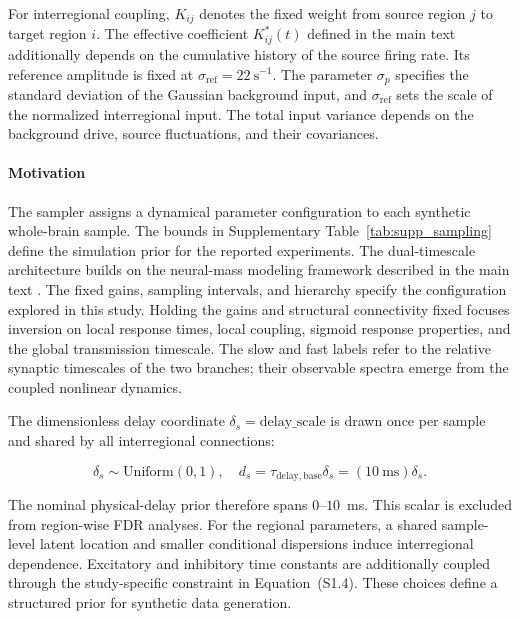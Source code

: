 \documentclass[11pt]{article}
\begin{document}
For interregional coupling, $K_{ij}$ denotes the fixed weight from source region $j$ to target region $i$. The effective coefficient $K_{ij}^{*}(t)$ defined in the main text additionally depends on the cumulative history of the source firing rate. Its reference amplitude is fixed at $\sigma_{\mathrm{ref}}=22~\mathrm{s}^{-1}$. The parameter $\sigma_p$ specifies the standard deviation of the Gaussian background input, and $\sigma_{\mathrm{ref}}$ sets the scale of the normalized interregional input. The total input variance depends on the background drive, source fluctuations, and their covariances.


\paragraph{Motivation}
The sampler assigns a dynamical parameter configuration to each synthetic whole-brain sample. The bounds in Supplementary Table~\ref{tab:supp_sampling} define the simulation prior for the reported experiments. The dual-timescale architecture builds on the neural-mass modeling framework described in the main text \citep{david2003modeling}. The fixed gains, sampling intervals, and hierarchy specify the configuration explored in this study. Holding the gains and structural connectivity fixed focuses inversion on local response times, local coupling, sigmoid response properties, and the global transmission timescale. The slow and fast labels refer to the relative synaptic timescales of the two branches; their observable spectra emerge from the coupled nonlinear dynamics.

The dimensionless delay coordinate $\delta_s=\mathrm{delay\_scale}$ is drawn once per sample and shared by all interregional connections:


\begin{equation}
\delta_s \sim \mathrm{Uniform}(0, 1), \quad d_s = \tau_{\mathrm{delay,base}}\delta_s = (10\mathrm{~ms})\delta_s. \tag{S1.1}
\label{eq:supp_delay}
\end{equation}



The nominal physical-delay prior therefore spans $0$--$10$~ms. This scalar is excluded from region-wise FDR analyses. For the regional parameters, a shared sample-level latent location and smaller conditional dispersions induce interregional dependence. Excitatory and inhibitory time constants are additionally coupled through the study-specific constraint in Equation~(S1.4). These choices define a structured prior for synthetic data generation.
\end{document}
